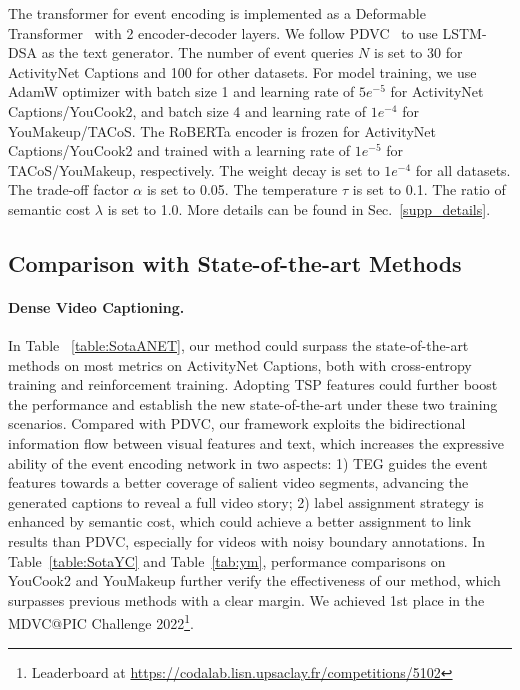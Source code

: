 The transformer for event encoding is implemented as a Deformable Transformer~\cite{zhu2020deformable} with 2 encoder-decoder layers. We follow PDVC~\cite{wang2021end} to use LSTM-DSA as the text generator. The number of event queries $N$ is set to 30 for ActivityNet Captions and 100 for other datasets. For model training, we use AdamW optimizer with batch size 1 and learning rate of $5e^{-5}$ for ActivityNet Captions/YouCook2, and batch size 4 and learning rate of $1e^{-4}$ for YouMakeup/TACoS. The RoBERTa encoder is frozen for ActivityNet Captions/YouCook2 and trained with a learning rate of $1e^{-5}$ for TACoS/YouMakeup, respectively. The weight decay is set to $1e^{-4}$ for all datasets. The trade-off factor $\alpha$ is set to 0.05. The temperature $\tau$ is set to 0.1. The ratio of semantic cost $\lambda$ is set to 1.0. More details can be found in Sec.~\ref{supp_details}.  

\subsection{Comparison with State-of-the-art Methods}

\paragraph{\textbf{Dense Video Captioning.}} In Table ~\ref{table:SotaANET}, our method could surpass the state-of-the-art methods on most metrics on ActivityNet Captions, both with cross-entropy training and reinforcement training. Adopting TSP features could further boost the performance and establish the new state-of-the-art under these two training scenarios. Compared with PDVC, our framework exploits the bidirectional information flow between visual features and text, which increases the expressive ability of the event encoding network in two aspects: 1) TEG guides the event features towards a better coverage of salient video segments, advancing the generated captions to reveal a full video story; 2) label assignment strategy is enhanced by semantic cost, which could achieve a better assignment to link results than PDVC, especially for videos with noisy boundary annotations. In Table~\ref{table:SotaYC} and Table~\ref{tab:ym}, performance comparisons on YouCook2 and YouMakeup further verify the effectiveness of our method, which surpasses previous methods with a clear margin. We achieved 1st place in the MDVC@PIC Challenge 2022\footnote{Leaderboard at \url{https://codalab.lisn.upsaclay.fr/competitions/5102}}. 
\vspace{-1.0em}
